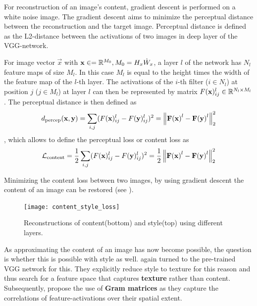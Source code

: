 For reconstruction of an image's content, gradient descent is performed on a white noise image.
The gradient descent aims to minimize the perceptual distance between the reconstruction and the target image.
Perceptual distance is defined as the L2-distance between the activations of two images in deep layer of the VGG-network.

For image vector $\vec{x}$ with $\mathbf{x} \in = \mathbb{R}^{M_0}, M_0 = H_x \dot W_x $, a layer $l$ of the network has $N_l$ feature maps of size $M_l$.
In this case $M_l$ is equal to the height times the width of the feature map of the $l$-th layer.
The activations of the $i$-th filter ($i \in N_l$) at position $j$ ($j \in M_l$) at layer $l$ can then be represented by matrix $F(\mathbf{x})_{ij}^l \in \mathbb{R}^{N_l \times M_l}$.
The perceptual distance is then defined as
\begin{align}
    d_{\text{percep}}(\mathbf{x}, \mathbf{y}) = \sum_{i, j} (F(\mathbf{x})_{ij}^l - F(\mathbf{y})_{ij}^l)^2 = \left\lVert\mathbf{F(\mathbf{x})}^l - \mathbf{F(\mathbf{y})}^l\right\rVert_2^2
\end{align}
, which allows to define the perceptual loss or content loss as 
\begin{align}
    \mathcal{L}_{\text{content}} = \frac{1}{2} \sum_{i, j} (F(\mathbf{x})_{ij}^l - F(\mathbf{y})_{ij}^l)^2 = \frac{1}{2} \left\lVert\mathbf{F(\mathbf{x})}^l - \mathbf{F(\mathbf{y})}^l\right\rVert_2^2
\end{align}


Minimizing the content loss between two images, by using gradient descent the content of an image can be restored (see ).

\begin{figure}
    \texttt{[image: content\_style\_loss]}
    \caption[]{Reconstructions of content(bottom) and style(top) using different layers. \cite{gatys}}
\end{figure}

As approximating the content of an image has now become possible, the question is whether this is possible with style as well.
\citeauthor*{gatys} again turned to the pre-trained VGG network for this.
They explicitly reduce style to texture for this reason and thus search for a feature space that captures \textbf{texture} rather than content.
Subsequently, \citeauthor*{gatys} propose the use of \textbf{Gram matrices} as they capture the correlations of feature-activations over their spatial extent.

